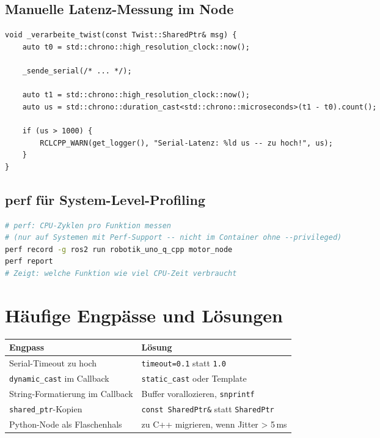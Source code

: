 \subsection{Manuelle Latenz-Messung im Node}

\begin{lstlisting}[style=cpp]
void _verarbeite_twist(const Twist::SharedPtr& msg) {
    auto t0 = std::chrono::high_resolution_clock::now();

    _sende_serial(/* ... */);

    auto t1 = std::chrono::high_resolution_clock::now();
    auto us = std::chrono::duration_cast<std::chrono::microseconds>(t1 - t0).count();

    if (us > 1000) {
        RCLCPP_WARN(get_logger(), "Serial-Latenz: %ld us -- zu hoch!", us);
    }
}
\end{lstlisting}

\subsection{perf für System-Level-Profiling}

\begin{lstlisting}[language=bash]
# perf: CPU-Zyklen pro Funktion messen
# (nur auf Systemen mit Perf-Support -- nicht im Container ohne --privileged)
perf record -g ros2 run robotik_uno_q_cpp motor_node
perf report
# Zeigt: welche Funktion wie viel CPU-Zeit verbraucht
\end{lstlisting}

\section{Häufige Engpässe und Lösungen}

\begin{center}
\begin{tabular}{ll}
\hline
\textbf{Engpass} & \textbf{Lösung} \\
\hline
Serial-Timeout zu hoch & \texttt{timeout=0.1} statt \texttt{1.0} \\
\texttt{dynamic\_cast} im Callback & \texttt{static\_cast} oder Template \\
String-Formatierung im Callback & Buffer vorallozieren, \texttt{snprintf} \\
\texttt{shared\_ptr}-Kopien & \texttt{const SharedPtr\&} statt \texttt{SharedPtr} \\
Python-Node als Flaschenhals & zu C++ migrieren, wenn Jitter > 5\,ms \\
\hline
\end{tabular}
\end{center}


